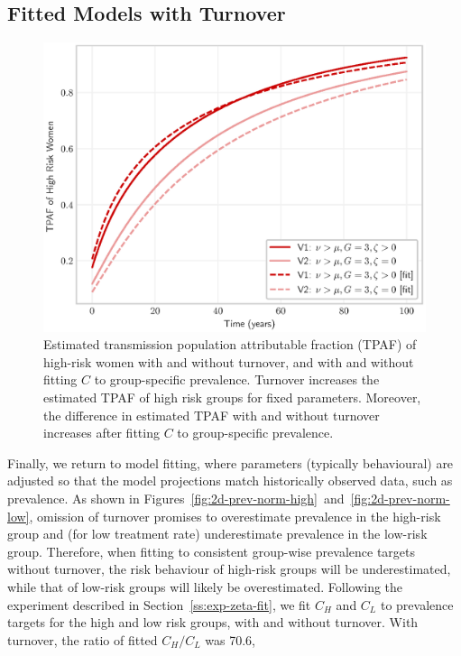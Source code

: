 \documentclass[10pt]{article}
\newlength{\figi}  \setlength{\figi}  {0.800\textwidth}
\numberwithin{equation}{section}
\begin{document}
\subsection{Fitted Models with Turnover}\label{ss:rd-zeta-fit}
\begin{figure}
  \centering
  \includegraphics[width=\figi]{tpaf-fit-not-C-compare.eps}
  \caption{Estimated transmission population attributable fraction (TPAF)
    of high-risk women with and without turnover,
    and with and without fitting $C$ to group-specific prevalence.
    Turnover increases the estimated TPAF of high risk groups for fixed parameters.
    Moreover, the difference in estimated TPAF with and without turnover
    increases after fitting $C$ to group-specific prevalence.}
  \label{fig:tpaf}
\end{figure}
Finally, we return to model fitting,
where parameters (typically behavioural) are adjusted so that
the model projections match historically observed data, such as prevalence.
As shown in Figures~\ref{fig:2d-prev-norm-high}~and~\ref{fig:2d-prev-norm-low},
omission of turnover promises to overestimate prevalence in the high-risk group
and (for low treatment rate) underestimate prevalence in the low-risk group.
Therefore, when fitting to consistent group-wise prevalence targets without turnover,
the risk behaviour of high-risk groups will be underestimated,
while that of low-risk groups will likely be overestimated.
Following the experiment described in Section~\ref{ss:exp-zeta-fit},
we fit $C_H$ and $C_L$ to prevalence targets for the high and low risk groups,
with and without turnover.
With turnover, the ratio of fitted $C_H / C_L$ was 70.6,
\end{document}
